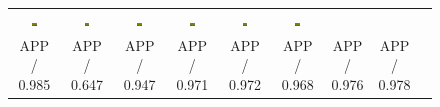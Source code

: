 \begin{figure} [tb]
\begin{tabular*}{\textwidth}{ccccccccc}
\includegraphics[width=0.12\textwidth]{./SR4VT/images/2_16_s_Z_lmnn_5_label.jpg} &
\includegraphics[width=0.12\textwidth]{./SR4VT/images/2_16_s_R_lmnn_5_label.jpg} &
\includegraphics[width=0.12\textwidth]{./SR4VT/images/2_16_s_S_lmnn_5_label.jpg} &
\includegraphics[width=0.12\textwidth]{./SR4VT/images/2_16_s_A_lmnn_5_label.jpg} &
\includegraphics[width=0.12\textwidth]{./SR4VT/images/2_16_s_J_lmnn_5_label.jpg} & 
\includegraphics[width=0.12\textwidth]{./SR4VT/images/2_16_s_R_lmnn_5_label.jpg}  \\
\scriptsize{APP / 0.985} & \scriptsize{APP / 0.647} & \scriptsize{APP / 0.947} & \scriptsize{APP / 0.971}
 & \scriptsize{APP / 0.972} & \scriptsize{APP / 0.968} & \scriptsize{APP / 0.976}  & \scriptsize{APP / 0.978}  \\



\end{tabular*}
\end{figure}

